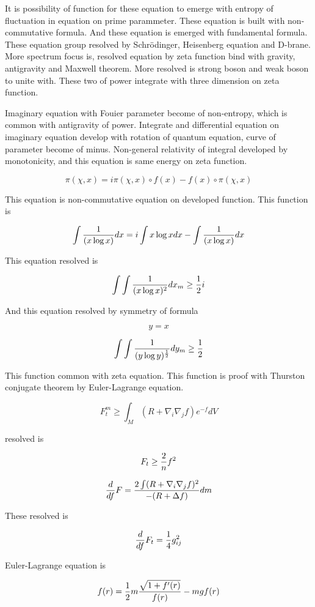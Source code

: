 \documentclass{jsarticle}
\begin{document}
  It is possibility of function for these equation to emerge with entropy of fluctuation in equation on prime 
parammeter. These equation is built with non-commutative formula. And these equation is emerged with fundamental
formula. These equation group resolved by Schr\"{o}dinger, Heisenberg equation and D-brane.
More spectrum focus is, resolved equation by zeta function bind with gravity, antigravity and Maxwell theorem.
More resolved is strong boson and weak boson to unite with. These two of power integrate with three dimension
on zeta function.

  Imaginary equation with Fouier parameter become of non-entropy, which is common with antigravity of power.
Integrate and differential equation on imaginary equation develop with rotation of quantum equation, curve of
parameter become of minus. Non-general relativity of integral developed by monotonicity, and this equation
is same energy on zeta function.

  $$ \pi(\chi,x) = i \pi (\chi,x) \circ f(x) - f(x) \circ \pi (\chi, x) $$

  This equation is non-commutative equation on developed function. This function is

  $$ \int {1 \over (x \log x)}dx = i \int x \log xdx - \int {1 \over (x \log x)}dx $$

  This equation resolved is

  $$ \int \int {1 \over (x \log x)^2}dx_{m} \ge {1 \over 2}i $$

  And this equation resolved by symmetry of formula

  $$ y = x $$

  $$ \int \int {1 \over (y \log y)^{1 \over 2}}dy_{m} \ge {1 \over 2} $$

  This function common with zeta equation. This function is proof with Thurston conjugate theorem by Euler-Lagrange
equation.

  $$ F^m_{t} \ge \int_{M} (R + \nabla_{i} \nabla_{j} f)e^{-f}dV $$

  resolved is

  $$ F_{t} \ge {2 \over n}f^2  $$

  $$ {d \over df}F = {2 \int (R + \nabla_{i} \nabla_{j} f)^2 \over - (R + \Delta f)}dm $$

  These resolved is

  $$ {d \over df}F_{t} = {1 \over 4}g^2_{ij} $$

  Euler-Lagrange equation is

  $$ f(r) = {1 \over 2}m{\sqrt{1 + f'(r)} \over f(r)} - mgf(r) $$
\end{document}
